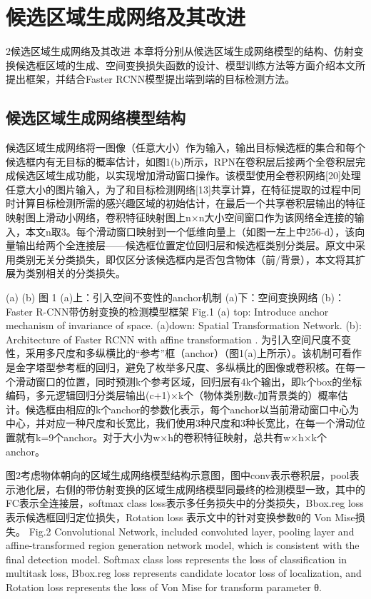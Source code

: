  
\section{候选区域生成网络及其改进}
2候选区域生成网络及其改进
本章将分别从候选区域生成网络模型的结构、仿射变换候选框区域的生成、空间变换损失函数的设计、模型训练方法等方面介绍本文所提出框架，并结合Faster RCNN模型提出端到端的目标检测方法。
\subsection{候选区域生成网络模型结构}
候选区域生成网络将一图像（任意大小）作为输入，输出目标候选框的集合和每个候选框内有无目标的概率估计，如图1(b)所示，RPN在卷积层后接两个全卷积层完成候选区域生成功能，以实现增加滑动窗口操作。该模型使用全卷积网络[20]处理任意大小的图片输入，为了和目标检测网络[13]共享计算，在特征提取的过程中同时计算目标检测所需的感兴趣区域的初始估计，在最后一个共享卷积层输出的特征映射图上滑动小网络，卷积特征映射图上n×n大小空间窗口作为该网络全连接的输入，本文n取3。每个滑动窗口映射到一个低维向量上（如图一左上中256-d），该向量输出给两个全连接层——候选框位置定位回归层和候选框类别分类层。原文中采用类别无关分类损失，即仅区分该候选框内是否包含物体（前/背景），本文将其扩展为类别相关的分类损失。
 
           (a)                                            (b)        
图 1 (a)上：引入空间不变性的anchor机制  (a)下：空间变换网络  (b)：Faster R-CNN带仿射变换的检测模型框架
Fig.1 (a) top:  Introduce anchor mechanism of invariance of space. (a)down: Spatial Transformation Network. (b): Architecture of Faster RCNN with affine transformation .
为引入空间尺度不变性，采用多尺度和多纵横比的“参考”框（anchor）（图1(a)上所示）。该机制可看作是金字塔型参考框的回归，避免了枚举多尺度、多纵横比的图像或卷积核。在每一个滑动窗口的位置，同时预测k个参考区域，回归层有4k个输出，即k个box的坐标编码，多元逻辑回归分类层输出(c+1)×k个（物体类别数c加背景类的）概率估计。候选框由相应的k个anchor的参数化表示，每个anchor以当前滑动窗口中心为中心，并对应一种尺度和长宽比，我们使用3种尺度和3种长宽比，在每一个滑动位置就有k=9个anchor。对于大小为w×h的卷积特征映射，总共有w×h×k个anchor。
 
图2考虑物体朝向的区域生成网络模型结构示意图，图中conv表示卷积层，pool表示池化层，右侧的带仿射变换的区域生成网络模型同最终的检测模型一致，其中的FC表示全连接层，softmax class loss表示多任务损失中的分类损失，Bbox.reg loss 表示候选框回归定位损失，Rotation loss 表示文中的针对变换参数θ的 Von Mise损失。
Fig.2 Convolutional Network, included convoluted layer, pooling layer and  affine-transformed region generation network model, which is consistent with the final detection model. Softmax class loss represents the loss of classification in multitask loss, Bbox.reg loss represents candidate locator loss of localization, and Rotation loss represents the loss of Von Mise for transform parameter θ.
